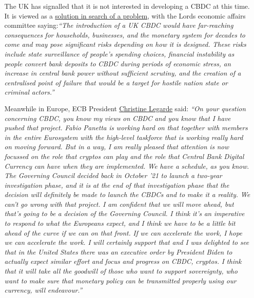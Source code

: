 The UK has signalled that it is not interested in developing a CBDC at this time. It is viewed as a \href{https://committees.parliament.uk/publications/8443/documents/85604/default/}{solution in search of a problem}, with the Lords economic affairs committee saying:\textit{``The introduction of a UK CBDC would have far-reaching consequences for households, businesses, and the monetary system for decades to come and may pose significant risks depending on how it is designed. These risks include state surveillance of people’s spending choices, financial instability as people convert bank deposits to CBDC during periods of economic stress, an increase in central bank power without sufficient scrutiny, and the creation of a centralised point of failure that would be a target for hostile nation state or criminal actors.''}\par
Meanwhile in Europe, ECB President \href{https://www.ecb.europa.eu/press/pressconf/2022/html/ecb.is220310~1bc8c1b1ca.en.html#qa}{Christine Legarde} said: \textit{``On your question concerning CBDC, you know my views on CBDC and you know that I have pushed that project. Fabio Panetta is working hard on that together with members in the entire Eurosystem with the high-level taskforce that is working really hard on moving forward. But in a way, I am really pleased that attention is now focussed on the role that cryptos can play and the role that Central Bank Digital Currency can have when they are implemented. We have a schedule, as you know. The Governing Council decided back in October '21 to launch a two-year investigation phase, and it is at the end of that investigation phase that the decision will definitely be made to launch the CBDCs and to make it a reality. We can't go wrong with that project. I am confident that we will move ahead, but that's going to be a decision of the Governing Council. I think it's an imperative to respond to what the Europeans expect, and I think we have to be a little bit ahead of the curve if we can on that front. If we can accelerate the work, I hope we can accelerate the work. I will certainly support that and I was delighted to see that in the United States there was an executive order by President Biden to actually expect similar effort and focus and progress on CBDC, cryptos. I think that it will take all the goodwill of those who want to support sovereignty, who want to make sure that monetary policy can be transmitted properly using our currency, will endeavour.''}\par
